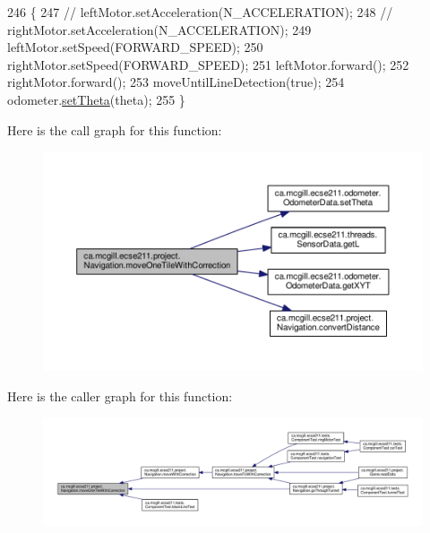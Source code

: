 \begin{DoxyCode}
246                                                       \{
247     \textcolor{comment}{// leftMotor.setAcceleration(N\_ACCELERATION);}
248     \textcolor{comment}{// rightMotor.setAcceleration(N\_ACCELERATION);}
249     leftMotor.setSpeed(FORWARD\_SPEED);
250     rightMotor.setSpeed(FORWARD\_SPEED);
251     leftMotor.forward();
252     rightMotor.forward();
253     moveUntilLineDetection(\textcolor{keyword}{true});
254     odometer.\hyperlink{classca_1_1mcgill_1_1ecse211_1_1odometer_1_1_odometer_data_a419b8f07c2c5374411c8e62298e9a402}{setTheta}(theta);
255   \}
\end{DoxyCode}
Here is the call graph for this function\+:\nopagebreak
\begin{figure}[H]
\begin{center}
\leavevmode
\includegraphics[width=350pt]{classca_1_1mcgill_1_1ecse211_1_1project_1_1_navigation_afbe677941e2bd44e35452e1eff508ae9_cgraph}
\end{center}
\end{figure}
Here is the caller graph for this function\+:\nopagebreak
\begin{figure}[H]
\begin{center}
\leavevmode
\includegraphics[width=350pt]{classca_1_1mcgill_1_1ecse211_1_1project_1_1_navigation_afbe677941e2bd44e35452e1eff508ae9_icgraph}
\end{center}
\end{figure}
\mbox{\label{classca_1_1mcgill_1_1ecse211_1_1project_1_1_navigation_a48eeb9ae2da23664421e8da5642054c7}} 
